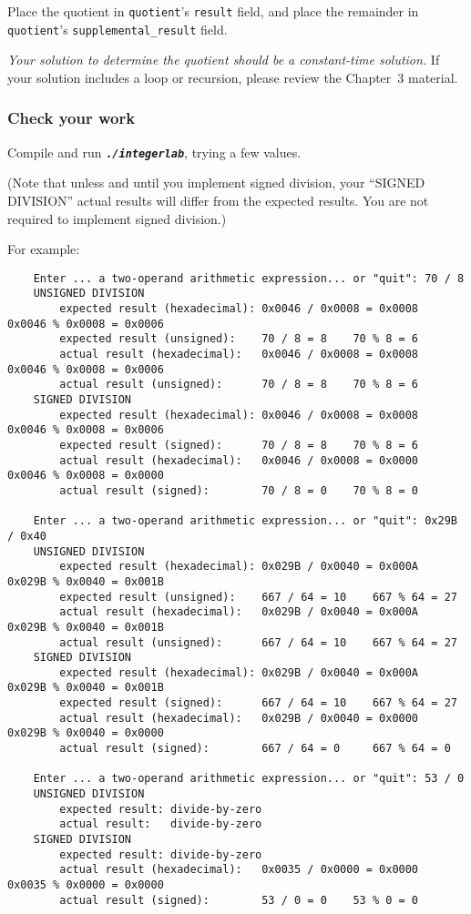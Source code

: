 Place the quotient in \lstinline{quotient}'s \lstinline{result} field, and place the remainder in \lstinline{quotient}'s \lstinline{supplemental_result} field.

\textit{Your solution to determine the quotient should be a constant-time solution.}
If your solution includes a loop or recursion, please review the Chapter~3 material.


\subsubsection*{Check your work}

Compile and run \texttt{\textbf{\textit{./integerlab}}}, trying a few values.

(Note that unless and until you implement signed division, your ``SIGNED DIVISION'' actual results will differ from the expected results.
You are not required to implement signed division.)

For example:
\begin{small}\begin{verbatim}
    Enter ... a two-operand arithmetic expression... or "quit": 70 / 8
    UNSIGNED DIVISION
        expected result (hexadecimal): 0x0046 / 0x0008 = 0x0008    0x0046 % 0x0008 = 0x0006
        expected result (unsigned):    70 / 8 = 8    70 % 8 = 6
        actual result (hexadecimal):   0x0046 / 0x0008 = 0x0008    0x0046 % 0x0008 = 0x0006
        actual result (unsigned):      70 / 8 = 8    70 % 8 = 6
    SIGNED DIVISION
        expected result (hexadecimal): 0x0046 / 0x0008 = 0x0008    0x0046 % 0x0008 = 0x0006
        expected result (signed):      70 / 8 = 8    70 % 8 = 6
        actual result (hexadecimal):   0x0046 / 0x0008 = 0x0000    0x0046 % 0x0008 = 0x0000
        actual result (signed):        70 / 8 = 0    70 % 8 = 0

    Enter ... a two-operand arithmetic expression... or "quit": 0x29B / 0x40
    UNSIGNED DIVISION
        expected result (hexadecimal): 0x029B / 0x0040 = 0x000A    0x029B % 0x0040 = 0x001B
        expected result (unsigned):    667 / 64 = 10    667 % 64 = 27
        actual result (hexadecimal):   0x029B / 0x0040 = 0x000A    0x029B % 0x0040 = 0x001B
        actual result (unsigned):      667 / 64 = 10    667 % 64 = 27
    SIGNED DIVISION
        expected result (hexadecimal): 0x029B / 0x0040 = 0x000A    0x029B % 0x0040 = 0x001B
        expected result (signed):      667 / 64 = 10    667 % 64 = 27
        actual result (hexadecimal):   0x029B / 0x0040 = 0x0000    0x029B % 0x0040 = 0x0000
        actual result (signed):        667 / 64 = 0     667 % 64 = 0

    Enter ... a two-operand arithmetic expression... or "quit": 53 / 0
    UNSIGNED DIVISION
        expected result: divide-by-zero
        actual result:   divide-by-zero
    SIGNED DIVISION
        expected result: divide-by-zero
        actual result (hexadecimal):   0x0035 / 0x0000 = 0x0000    0x0035 % 0x0000 = 0x0000
        actual result (signed):        53 / 0 = 0    53 % 0 = 0
\end{verbatim}\end{small}

